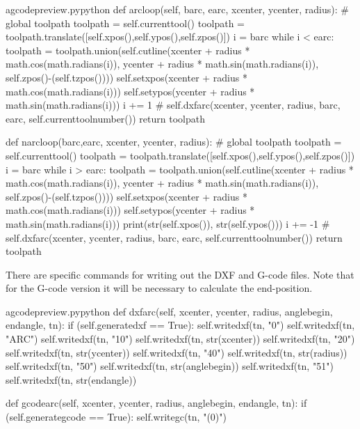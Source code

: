 \documentclass{ltxdoc}
\begin{document}
\lstset{firstnumber=\thegcpy}
\begin{writecode}{a}{gcodepreview.py}{python}
    def arcloop(self, barc, earc, xcenter, ycenter, radius):
#        global toolpath
        toolpath = self.currenttool()
        toolpath = toolpath.translate([self.xpos(),self.ypos(),self.zpos()])
        i = barc
        while i < earc: 
            toolpath = toolpath.union(self.cutline(xcenter + radius * math.cos(math.radians(i)), ycenter + radius * math.sin(math.radians(i)), self.zpos()-(self.tzpos())))
            self.setxpos(xcenter + radius * math.cos(math.radians(i)))
            self.setypos(ycenter + radius * math.sin(math.radians(i)))
            i += 1
#        self.dxfarc(xcenter, ycenter, radius, barc, earc, self.currenttoolnumber())
        return toolpath

    def narcloop(barc,earc, xcenter, ycenter, radius):
#        global toolpath
        toolpath = self.currenttool()
        toolpath = toolpath.translate([self.xpos(),self.ypos(),self.zpos()])
        i = barc
        while i > earc: 
            toolpath = toolpath.union(self.cutline(xcenter + radius * math.cos(math.radians(i)), ycenter + radius * math.sin(math.radians(i)), self.zpos()-(self.tzpos())))
            self.setxpos(xcenter + radius * math.cos(math.radians(i)))
            self.setypos(ycenter + radius * math.sin(math.radians(i)))
            print(str(self.xpos()), str(self.ypos()))
            i += -1
#        self.dxfarc(xcenter, ycenter, radius, barc, earc, self.currenttoolnumber())
        return toolpath

\end{writecode}
\addtocounter{gcpy}{27}

There are specific commands for writing out the DXF and G-code files. Note that for the G-code version it will be necessary to calculate the end-position.

\lstset{firstnumber=\thegcpy}
\begin{writecode}{a}{gcodepreview.py}{python}
    def dxfarc(self, xcenter, ycenter, radius, anglebegin, endangle, tn):
        if (self.generatedxf == True):
            self.writedxf(tn, "0")
            self.writedxf(tn, "ARC")
            self.writedxf(tn, "10")
            self.writedxf(tn, str(xcenter))
            self.writedxf(tn, "20")
            self.writedxf(tn, str(ycenter))
            self.writedxf(tn, "40")
            self.writedxf(tn, str(radius))
            self.writedxf(tn, "50")
            self.writedxf(tn, str(anglebegin))
            self.writedxf(tn, "51")
            self.writedxf(tn, str(endangle))

    def gcodearc(self, xcenter, ycenter, radius, anglebegin, endangle, tn):
        if (self.generategcode == True):
            self.writegc(tn, "(0)")

\end{writecode}
\addtocounter{gcpy}{19}
\end{document}
